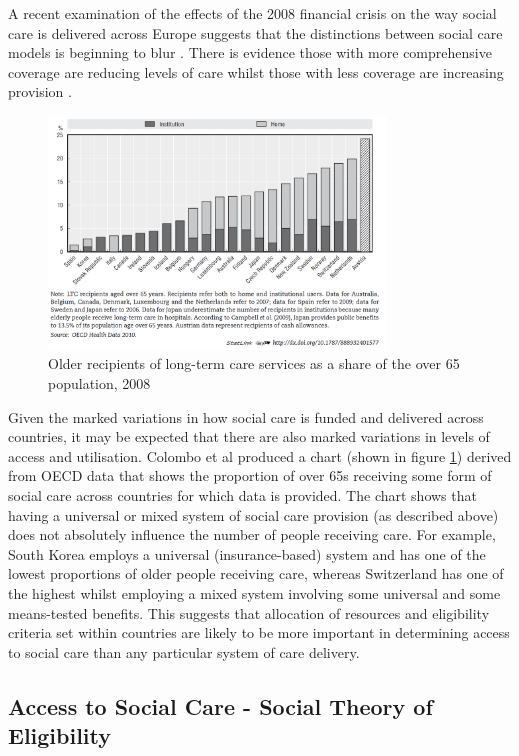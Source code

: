\documentclass[12pt,]{report}
\begin{document}
A recent examination of the effects of the 2008 financial crisis on the
way social care is delivered across Europe suggests that the
distinctions between social care models is beginning to blur
\citep{RN343}. There is evidence those with more comprehensive coverage
are reducing levels of care whilst those with less coverage are
increasing provision \citep{RN414}.

\begin{figure}[h]
  \centering
  \caption{Older recipients of long-term care services as a share of the over 65 population, 2008}
  \label{fig:oecd-comparison}
    \includegraphics[width=0.8\textwidth]{figures/oecd-comparison.PNG}
\end{figure}

Given the marked variations in how social care is funded and delivered
across countries, it may be expected that there are also marked
variations in levels of access and utilisation. Colombo et al
\citeyearpar{RN414} produced a chart (shown in figure
\ref{fig:oecd-comparison}) derived from OECD data that shows the
proportion of over 65s receiving some form of social care across
countries for which data is provided. The chart shows that having a
universal or mixed system of social care provision (as described above)
does not absolutely influence the number of people receiving care. For
example, South Korea employs a universal (insurance-based) system and
has one of the lowest proportions of older people receiving care,
whereas Switzerland has one of the highest whilst employing a mixed
system involving some universal and some means-tested benefits. This
suggests that allocation of resources and eligibility criteria set
within countries are likely to be more important in determining access
to social care than any particular system of care delivery.

\subsection{Access to Social Care - Social Theory of Eligibility}\label{subsubsec:eligibility-theory}
\end{document}
